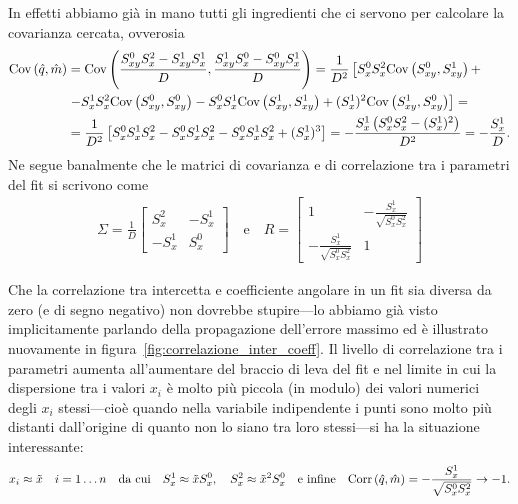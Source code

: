 In effetti abbiamo già in mano tutti gli ingredienti che ci servono per
calcolare la covarianza cercata, ovverosia
\begin{align}
  \cov{\hat{q}}{\hat{m}} & =
  \cov{\frac{S_{xy}^0 S_x^2 - S_{xy}^1 S_x^1}{D}}%
      {\frac{S_{xy}^1 S_x^0 - S_{xy}^0 S_x^1}{D}} =
      \frac{1}{D^2} \left[
        S_x^0S_x^2\cov{S_{xy}^0}{S_{xy}^1} + \right.\nonumber\\
       & \left. - S_x^1S_x^2\cov{S_{xy}^0}{S_{xy}^0} -
        S_x^0S_x^1\cov{S_{xy}^1}{S_{xy}^1} +
        (S_x^1)^2 \cov{S_{xy}^1}{S_{xy}^0}\right] = \nonumber\\
      & = \frac{1}{D^2} \left[
        S_x^0S_x^1S_x^2 - S_x^0S_x^1S_x^2 - S_x^0S_x^1S_x^2 + (S_x^1)^3
        \right]
      = -\frac{S_x^1\left(S_x^0S_x^2 - (S_x^1)^2 \right)}{D^2} =
      -\frac{S_x^1}{D}.
\end{align}
Ne segue banalmente che le matrici di covarianza e di correlazione tra i
parametri del fit si scrivono come
\begin{align}
  \Sigma = \frac{1}{D}
  \begin{bmatrix}
    S_x^2 & -S_x^1\\
    -S_x^1 & S_x^0
  \end{bmatrix}
  \quad \text{e} \quad
  R =
  \begin{bmatrix}
    1 & -\frac{S_x^1}{\sqrt{S_x^0S_x^2}}\\
    -\frac{S_x^1}{\sqrt{S_x^0S_x^2}} & 1
  \end{bmatrix}
\end{align}

Che la correlazione tra intercetta e coefficiente angolare in un fit sia
diversa da zero (e di segno negativo) non dovrebbe stupire---lo abbiamo già
visto implicitamente parlando della propagazione dell'errore massimo ed è
illustrato nuovamente in figura~\ref{fig:correlazione_inter_coeff}. Il livello
di correlazione tra i parametri aumenta all'aumentare del braccio di leva del
fit e nel limite in cui la dispersione tra i valori $x_i$ è molto più
piccola (in modulo) dei valori numerici degli $x_i$ stessi---cioè quando nella
variabile indipendente i punti sono molto più distanti dall'origine di quanto
non lo siano tra loro stessi---si ha la situazione interessante:
\begin{align}
  x_i \approx \tilde{x} \quad i=1 \ldots n
  \quad \text{da cui} \quad
  S_x^1 \approx \tilde{x} S_x^0, \quad
  S_x^2 \approx \tilde{x}^2 S_x^0
  \quad \text{e infine} \quad
  \text{Corr}\left(\hat{q}, \hat{m}\right) = -\frac{S_x^1}{\sqrt{S_x^0S_x^2}} \rightarrow -1.
\end{align}

